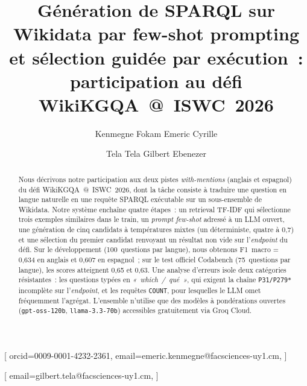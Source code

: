 \documentclass[]{ceurart}
\begin{document}


\title{Génération de SPARQL sur Wikidata par few-shot prompting et sélection guidée par exécution~: participation au défi WikiKGQA~@~ISWC~2026}

\tnotemark[1]

\author[1]{Kenmegne Fokam Emeric Cyrille}[%
orcid=0009-0001-4232-2361,
email=emeric.kenmegne@facsciences-uy1.cm,
]
\cormark[1]

\author[1]{Tela Tela Gilbert Ebenezer}[%
email=gilbert.tela@facsciences-uy1.cm,
]

\address[1]{Université de Yaoundé~I, Faculté des Sciences, BP 812 Yaoundé, Cameroun}


\begin{abstract}
Nous décrivons notre participation aux deux pistes \emph{with-mentions} (anglais et espagnol) du défi WikiKGQA~@~ISWC~2026, dont la tâche consiste à traduire une question en langue naturelle en une requête SPARQL exécutable sur un sous-ensemble de Wikidata. Notre système enchaîne quatre étapes~: un retrieval TF-IDF qui sélectionne trois exemples similaires dans le train, un \emph{prompt few-shot} adressé à un LLM ouvert, une génération de cinq candidats à températures mixtes (un déterministe, quatre à 0{,}7) et une sélection du premier candidat renvoyant un résultat non vide sur l'\emph{endpoint} du défi. Sur le développement (100~questions par langue), nous obtenons F1~macro = 0{,}634 en anglais et 0{,}607 en espagnol~; sur le test officiel Codabench (75~questions par langue), les scores atteignent 0{,}65 et 0{,}63. Une analyse d'erreurs isole deux catégories résistantes~: les questions typées en \emph{«~which~/~qué~»}, qui exigent la chaîne \texttt{P31/P279*} incomplète sur l'\emph{endpoint}, et les requêtes \texttt{COUNT}, pour lesquelles le LLM omet fréquemment l'agrégat. L'ensemble n'utilise que des modèles à pondérations ouvertes (\texttt{gpt-oss-120b}, \texttt{llama-3.3-70b}) accessibles gratuitement via Groq Cloud.
\end{abstract}
\end{document}
